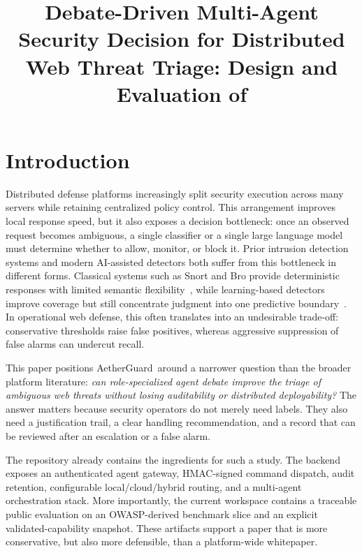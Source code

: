 \documentclass[pdflatex,sn-mathphys-num]{sn-jnl}
\title[Debate-Driven Multi-Agent Security Decision]{Debate-Driven Multi-Agent Security Decision for Distributed Web Threat Triage: Design and Evaluation of \system}
\author*[1]{\fnm{Anonymous} \sur{Author}}\email{anonymous@example.com}
\affil*[1]{\orgdiv{Anonymous Institution}, \orgname{Anonymous Organization}, \orgaddress{\city{Anonymous City}, \country{Anonymous Country}}}
\newcommand{\system}{AetherGuard}
\begin{document}
\maketitle

\noindent{}

\section{Introduction}\label{sec:introduction}

Distributed defense platforms increasingly split security execution across many servers while retaining centralized policy control. This arrangement improves local response speed, but it also exposes a decision bottleneck: once an observed request becomes ambiguous, a single classifier or a single large language model must determine whether to allow, monitor, or block it. Prior intrusion detection systems and modern AI-assisted detectors both suffer from this bottleneck in different forms. Classical systems such as Snort and Bro provide deterministic responses with limited semantic flexibility~\cite{roesch1999snort,paxson1999bro}, while learning-based detectors improve coverage but still concentrate judgment into one predictive boundary~\cite{doriguzzi2020lucid,neupane2022xids,holdbrook2024survey}. In operational web defense, this often translates into an undesirable trade-off: conservative thresholds raise false positives, whereas aggressive suppression of false alarms can undercut recall.

This paper positions \system\ around a narrower question than the broader platform literature: \emph{can role-specialized agent debate improve the triage of ambiguous web threats without losing auditability or distributed deployability?} The answer matters because security operators do not merely need labels. They also need a justification trail, a clear handling recommendation, and a record that can be reviewed after an escalation or a false alarm.

The repository already contains the ingredients for such a study. The backend exposes an authenticated agent gateway, HMAC-signed command dispatch, audit retention, configurable local/cloud/hybrid routing, and a multi-agent orchestration stack. More importantly, the current workspace contains a traceable public evaluation on an OWASP-derived benchmark slice and an explicit validated-capability snapshot. These artifacts support a paper that is more conservative, but also more defensible, than a platform-wide whitepaper.
\end{document}
